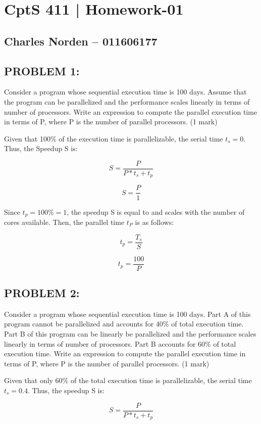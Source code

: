 \documentclass[12pt,letterpaper]{article}
\begin{document}
\section*{CptS 411 | Homework-01 }
\subsection*{Charles Norden -- 011606177 }

\subsection*{PROBLEM 1:}
Consider a program whose sequential execution time is 100 days. Assume that the program can be parallelized and the performance scales linearly in terms of number of processors. Write an expression to compute the parallel execution time in terms of P, where P is the number of parallel processors. (1 mark)

\hline

Given that 100\% of the execution time is parallelizable, the serial time \(t_s = 0\). Thus, the Speedup S is:

\[ S = \frac{P}{P * t_s + t_p} \]

\[ S = \frac{P}{1} \]

Since \(t_p = 100\% = 1\), the speedup S is equal to and scales with the number of cores available. Then, the parallel time \(t_{P}\) is as follows:

\[ t_p = \frac{T_s}{S} \]

\[ t_p = \frac{100}{P} \]

\pagebreak


\subsection*{PROBLEM 2:}
Consider a program whose sequential execution time is 100 days. Part A of this program cannot be parallelized and accounts for 40\% of total execution time. Part B of this program can be linearly be parallelized and the performance scales linearly in terms of number of processors. Part B accounts for 60\% of total execution time. Write an expression to compute the parallel execution time in terms of P, where P is the number of parallel processors. (1 mark)

\hline

Given that only 60\% of the total execution time is parallelizable, the serial time \(t_s = 0.4\). Thus, the speedup S is:

\[ S = \frac{P}{P * t_s + t_p} \]
\end{document}
